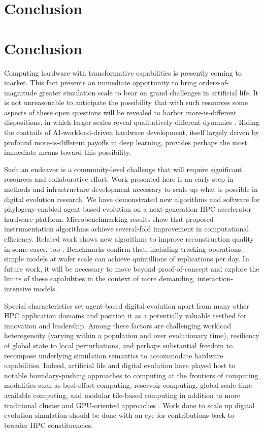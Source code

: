 \section{Conclusion} \label{sec:conclusion}

\section{Conclusion} \label{sec:conclusion}

Computing hardware with transformative capabilities is presently coming to market.
This fact presents an immediate opportunity to bring orders-of-magnitude greater simulation scale to bear on grand challenges in artificial life.
It is not unreasonable to anticipate the possibility that with such resources some aspects of these open questions will be revealed to harbor more-is-different dispositions, in which larger scales reveal qualitatively different dynamics \citep{anderson1972more}.
Riding the coattails of AI-workload-driven hardware development, itself largely driven by profound more-is-different payoffs in deep learning, provides perhaps the most immediate means toward this possibility.

Such an endeavor is a community-level challenge that will require significant resources and collaborative effort.
Work presented here is an early step in methods and infrastructure development necessary to scale up what is possible in digital evolution research.
We have demonstrated new algorithms and software for phylogeny-enabled agent-based evolution on a next-generation HPC accelerator hardware platform.
Microbenchmarking results show that proposed instrumentation algorithms achieve several-fold improvement in computational efficiency.
Related work shows new algorithms to improve reconstruction quality in some cases, too \citep{moreno2024guide}.
Benchmarks confirm that, including tracking operations, simple models at wafer scale can achieve quintillions of replications per day.
In future work, it will be necessary to move beyond proof-of-concept and explore the limits of these capabilities in the context of more demanding, interaction-intensive models.

Special characteristics set agent-based digital evolution apart from many other HPC application domains and position it as a potentially valuable testbed for innovation and leadership.
Among these factors are challenging workload heterogeneity (varying within a population and over evolutionary time), resiliency of global state to local perturbations, and perhaps substantial freedom to recompose underlying simulation semantics to accommodate hardware capabilities.
Indeed, artificial life and digital evolution have played host to notable boundary-pushing approaches to computing at the frontiers of computing modalities such as best-effort computing, reservoir computing, global-scale time-available computing, and modular tile-based computing in addition to more traditional cluster and GPU-oriented approaches \citep{moreno2021conduit,ackley2020best,ackley2023robust,heinemann2008artificial,miikkulainen2024evolving,ray1995proposal}.
Work done to scale up digital evolution simulation should be done with an eye for contributions back to broader HPC constituencies.

